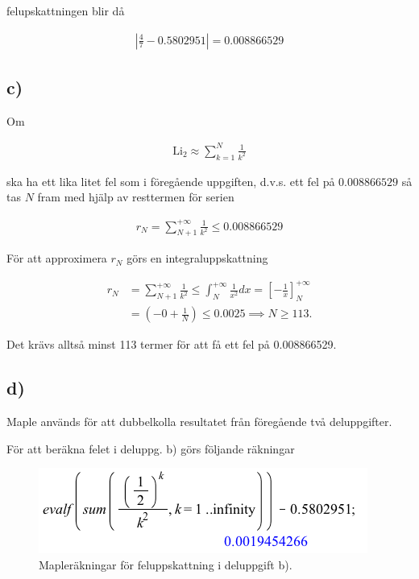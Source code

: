 \documentclass[a4paper]{article}
\begin{document}
\noindent felupskattningen blir då

\begin{align*}
	\left| \frac 47 - 0.5802951 \right| = 0.008866529
\end{align*}

\subsection*{c)}

Om

\begin{align*}
  \text{Li}_2 \approx \sum_{k=1}^{N}\frac{1}{k^2}
\end{align*}

\noindent ska ha ett lika litet fel som i föregående uppgiften, d.v.s. ett fel på $0.008866529$ så tas $N$ fram med hjälp av resttermen för serien

\begin{align*}
  r_N = \sum_{N+1}^{+\infty}\frac{1}{k^2} \leq 0.008866529
\end{align*}

\noindent För att approximera $r_N$ görs en integraluppskattning

\begin{align*}
  r_N &= \sum_{N+1}^{+\infty}\frac{1}{k^2} \leq \int_N^{+\infty}\frac{1}{x^2}dx = \left[-\frac{1}{x}\right]_N^{+\infty}\\
  &= \left(-0 + \frac{1}{N}\right) \leq 0.0025 \implies N \geq 113.
\end{align*}

\noindent Det krävs alltså minst 113 termer för att få ett fel på 0.008866529.

\subsection*{d)}

Maple används för att dubbelkolla resultatet från föregående två deluppgifter.

För att beräkna felet i deluppg. b) görs följande räkningar

\begin{figure}[h!]
	\centering
	\includegraphics[width=0.5\linewidth]{maple_241.png}
	\caption{Mapleräkningar för feluppskattning i deluppgift b).}
	\label{fig:maple_241}
\end{figure}
\end{document}
